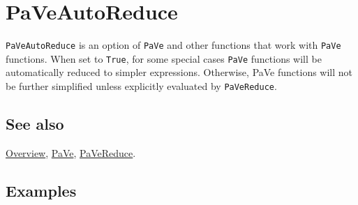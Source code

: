 \documentclass[../FeynCalcManual.tex]{subfiles}
\begin{document}
\hypertarget{paveautoreduce}{
\section{PaVeAutoReduce}\label{paveautoreduce}}

\texttt{PaVeAutoReduce} is an option of \texttt{PaVe} and other
functions that work with \texttt{PaVe} functions. When set to
\texttt{True}, for some special cases \texttt{PaVe} functions will be
automatically reduced to simpler expressions. Otherwise, PaVe functions
will not be further simplified unless explicitly evaluated by
\texttt{PaVeReduce}.

\subsection{See also}

\hyperlink{toc}{Overview}, \hyperlink{pave}{PaVe},
\hyperlink{pavereduce}{PaVeReduce}.

\subsection{Examples}
\end{document}
